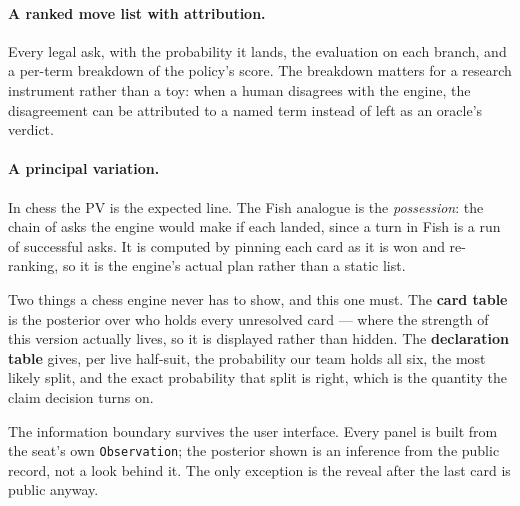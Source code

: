 \documentclass[11pt,letterpaper]{article}
\begin{document}
\paragraph{A ranked move list with attribution.} Every legal ask, with the
probability it lands, the evaluation on each branch, and a per-term breakdown of
the policy's score. The breakdown matters for a research instrument rather than
a toy: when a human disagrees with the engine, the disagreement can be
attributed to a named term instead of left as an oracle's verdict.

\paragraph{A principal variation.} In chess the PV is the expected line. The
Fish analogue is the \emph{possession}: the chain of asks the engine would make
if each landed, since a turn in Fish is a run of successful asks. It is computed
by pinning each card as it is won and re-ranking, so it is the engine's actual
plan rather than a static list.

Two things a chess engine never has to show, and this one must. The
\textbf{card table} is the posterior over who holds every unresolved card ---
where the strength of this version actually lives, so it is displayed rather
than hidden. The \textbf{declaration table} gives, per live half-suit, the
probability our team holds all six, the most likely split, and the exact
probability that split is right, which is the quantity the claim decision turns
on.

The information boundary survives the user interface. Every panel is built from
the seat's own \texttt{Observation}; the posterior shown is an inference from the
public record, not a look behind it. The only exception is the reveal after the
last card is public anyway.
\end{document}
